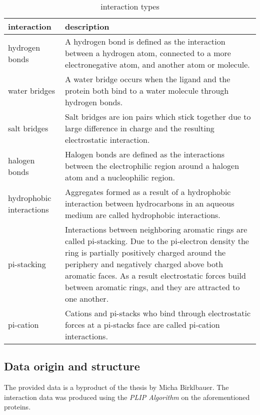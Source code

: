 \begin{table}[H]
    \centering
\begin{tabular}{ | m{10em} | m{30em}| } 
    \hline
    \textbf{interaction} &\textbf{description\cite[]{Birklbauer2021}}
    \\
    \hline
    hydrogen bonds& A hydrogen bond is defined as the interaction between a 
    hydrogen atom, connected to a more electronegative atom, and another atom or molecule. \\
    \hline
    water bridges   &A water bridge occurs when the ligand and the protein
    both bind to a water molecule through hydrogen bonds.\\
    \hline
    salt bridges&  Salt bridges are ion pairs which stick together due to
    large difference in charge and the resulting electrostatic interaction. \\
    \hline
    halogen bonds&  Halogen bonds are defined as the interactions between the electrophilic region
    around a halogen atom and a nucleophilic region.\\
    \hline
    hydrophobic interactions& Aggregates formed as a result
    of a hydrophobic interaction between hydrocarbons in an 
    aqueous medium are called hydrophobic interactions.\\
    \hline
    pi-stacking   & Interactions between neighboring aromatic 
    rings are called pi-stacking. Due to the pi-electron density the ring is partially positively charged around 
    the periphery and negatively charged above both aromatic faces. As a result electrostatic forces build between aromatic rings,
     and they are attracted to one another.\\
    \hline
    pi-cation& Cations and pi-stacks who bind through electrostatic 
    forces at a pi-stacks face are called pi-cation interactions.\\
    \hline
   \end{tabular}
   \caption{interaction types}
\end{table}
    


\subsection{Data origin and structure} 
The provided data is a byproduct of the thesis \cite[]{Birklbauer2021} by Micha Birklbauer.
The interaction data was produced using the \textit{PLIP Algorithm} \cite[]{Salentin2015} 
on the aforementioned proteins.

